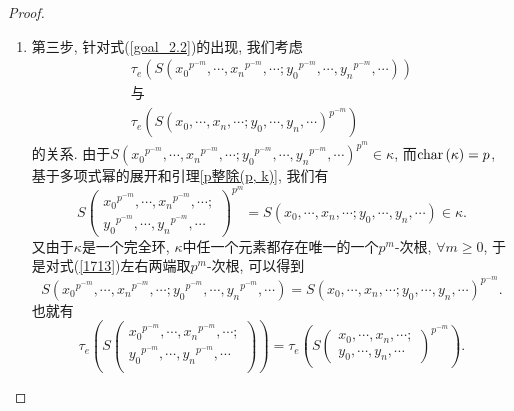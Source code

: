\documentclass[UTF8, twoside]{ctexart}
\theoremstyle{nonumberplain}
\newtheorem{proof}{\heiti 证明}  %
\theoremstyle{nonumberplain}
\theoremstyle{plain}
\begin{document}
\begin{proof}
\begin{enumerate}
			\item 第三步, 针对式(\ref{goal_2.2})的出现, 我们考虑
			\begin{gather*}
				 {{\tau }_{e}}\left( S\left( {{x}_{0}}^{{{p}^{-m}}},\cdots ,{{x}_{n}}^{{{p}^{-m}}},\cdots;{{y}_{0}}^{{{p}^{-m}}},\cdots ,{{y}_{n}}^{{{p}^{-m}}},\cdots  \right) \right) \\ 
				 \text{与} \\ 
				 {{\tau }_{e}}\left( S{{\left( {{x}_{0}},\cdots ,{{x}_{n}},\cdots;{{y}_{0}},\cdots ,{{y}_{n}},\cdots  \right)}^{{{p}^{-m}}}} \right) 
			\end{gather*}
			的关系. 由于$S{{\left( {{x}_{0}}^{{{p}^{-m}}},\cdots ,{{x}_{n}}^{{{p}^{-m}}},\cdots;{{y}_{0}}^{{{p}^{-m}}},\cdots ,{{y}_{n}}^{{{p}^{-m}}},\cdots  \right)}^{{{p}^{m}}}}\in \kappa $, 而$\textup{char}\left( \kappa  \right)=p$, 基于多项式幂的展开和引理\ref{p整除(p, k)}, 我们有
			\begin{equation} \label{1713}
				S{{\left( 
					\begin{matrix}
						{{x}_{0}}^{{{p}^{-m}}},\cdots ,{{x}_{n}}^{{{p}^{-m}}},\cdots;\\
						{{y}_{0}}^{{{p}^{-m}}},\cdots ,{{y}_{n}}^{{{p}^{-m}}},\cdots
					\end{matrix}
				\right)}^{{{p}^{m}}}}
						=S\left( {{x}_{0}},\cdots ,{{x}_{n}},\cdots;{{y}_{0}},\cdots ,{{y}_{n}},\cdots  
					\right)\in \kappa .
			\end{equation}
			又由于$\kappa $是一个完全环, $\kappa $中任一个元素都存在唯一的一个${{p}^{m}}$-次根, $\forall m\ge 0$, 于是对式(\ref{1713})左右两端取${{p}^{m}}$-次根, 可以得到
			\[
				S\left( {{x}_{0}}^{{{p}^{-m}}},\cdots ,{{x}_{n}}^{{{p}^{-m}}},\cdots;{{y}_{0}}^{{{p}^{-m}}},\cdots ,{{y}_{n}}^{{{p}^{-m}}},\cdots  \right)=S{{\left( {{x}_{0}},\cdots ,{{x}_{n}},\cdots;{{y}_{0}},\cdots ,{{y}_{n}},\cdots  \right)}^{{{p}^{-m}}}}.
			\]
			也就有
			\begin{equation} \label{goal_3}
				{{\tau }_{e}}\left( S\left( \begin{matrix}
					{{x}_{0}}^{{{p}^{-m}}},\cdots ,{{x}_{n}}^{{{p}^{-m}}},\cdots ;  \\
					{{y}_{0}}^{{{p}^{-m}}},\cdots ,{{y}_{n}}^{{{p}^{-m}}},\cdots   \\
				\end{matrix} \right) \right)
			={{\tau }_{e}}\left( S{{\left(
					\begin{matrix}
						{{x}_{0}},\cdots ,{{x}_{n}},\cdots;\\
						{{y}_{0}},\cdots ,{{y}_{n}},\cdots
					\end{matrix}
					   \right)}^{{{p}^{-m}}}} \right).
			\end{equation}
			\vskip 0.3cm
			

\end{enumerate}
\end{proof}
\end{document}
